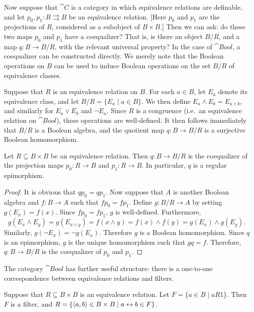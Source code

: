 Now suppose that $\cat{C}$ is a category in which equivalence
relations are definable, and let $p_0,p_1:R\rightrightarrows B$ be an
equivalence relation.  [Here $p_0$ and $p_1$ are the projections of
$R$, considered as a subobject of $B\times B$.]  Then we can ask: do
these two maps $p_0$ and $p_1$ have a coequalizer?  That is, is there
an object $B/R$, and a map $q:B\to B/R$, with the relevant universal
property?  In the case of $\cat{Bool}$, a coequalizer can be
constructed directly.  We merely note that the Boolean operations on
$B$ can be used to induce Boolean operations on the set $B/R$ of
equivalence classes.

\begin{defn} Suppose that $R$ is an equivalence
  relation on $B$.  For each $a\in B$, let $E_a$ denote its
  equivalence class, and let $B/R = \{ E_a\mid a\in B\}$.  We then
  define $E_a\wedge E_b=E_{a\wedge b}$, and similarly for $E_a\vee
  E_b$ and $\neg E_a$.  Since $R$ is a congruence (i.e.\ an
  equivalence relation on $\cat{Bool}$), these operations are
  well-defined.  It then follows immediately that $B/R$ is a Boolean
  algebra, and the quotient map $q:B\to B/R$ is a surjective Boolean
  homomorphism. \end{defn}

\begin{lemma} Let $R\subseteq B\times B$ be an equivalence relation.
  Then $q:B\to B/R$ is the coequalizer of the projection maps
  $p_0:R\to B$ and $p_1:R\to B$.  In particular, $q$ is a regular
  epimorphism. \end{lemma}

\begin{proof} It is obvious that $qp_0=qp_1$.  Now suppose that $A$ is
  another Boolean algebra and $f:B\to A$ such that $fp_0=fp_1$.
  Define $g:B/R\to A$ by setting $g(E_x)=f(x)$.  Since $fp_0=fp_1$,
  $g$ is well-defined.  Furthermore, 
  \[ g(E_x\wedge E_y)=g(E_{x\wedge y}) = f(x\wedge y)=f(x)\wedge
  f(y)=g(E_x)\wedge g(E_y) .\] Similarly, $g(\neg E_x)=\neg g(E_x)$.
  Therefore $g$ is a Boolean homomorphism.  Since $q$ is an
  epimorphism, $g$ is the unique homomorphism such that $gq=f$.
  Therefore, $q:B\to B/R$ is the coequalizer of $p_0$ and
  $p_1$. \end{proof}

The category $\cat{Bool}$ has further useful structure: there is a
one-to-one correspondence between equivalence relations and filters.


\begin{lemma} Suppose that $R\subseteq B\times B$ is an equivalence
  relation.  Let $F=\{ a\in B \mid aR1 \}$.  Then $F$ is a filter, and
  $R=\{ \langle a,b\rangle \in B\times B \mid a\leftrightarrow b\in
  F\}$. \end{lemma}

